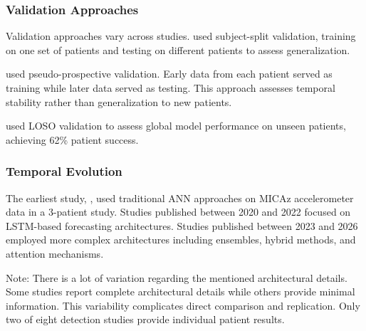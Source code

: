 \subsubsection{Validation Approaches}

Validation approaches vary across studies. \textcite{reintjesECGBasedDetectionEpileptic2025} used subject-split validation, training on one set of patients and testing on different patients to assess generalization.

\textcite{nasseriAmbulatorySeizureForecasting2021} used pseudo-prospective validation. Early data from each patient served as training while later data served as testing. This approach assesses temporal stability rather than generalization to new patients.

\textcite{meiselMachineLearningWristband2020} used LOSO validation to assess global model performance on unseen patients, achieving 62\% patient success.

\subsubsection{Temporal Evolution}

The earliest study, \textcite{borujenyDetectionEpilepticSeizure2013}, used traditional ANN approaches on MICAz accelerometer data in a 3-patient study. Studies published between 2020 and 2022 focused on LSTM-based forecasting architectures. Studies published between 2023 and 2026 employed more complex architectures including ensembles, hybrid methods, and attention mechanisms.

Note: There is a lot of variation regarding the mentioned architectural details. Some studies report complete architectural details while others provide minimal information. This variability complicates direct comparison and replication. Only two of eight detection studies provide individual patient results.
